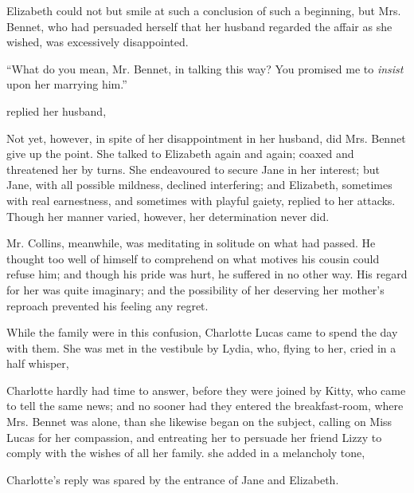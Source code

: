 Elizabeth could not but smile at such a conclusion of such a beginning, but Mrs. Bennet, who had persuaded herself that her husband regarded the affair as she wished, was excessively disappointed.

“What do you mean, Mr. Bennet, in talking this way? You promised me to {\em insist} upon her marrying him.”

 replied her husband, 

Not yet, however, in spite of her disappointment in her husband, did Mrs. Bennet give up the point. She talked to Elizabeth again and again; coaxed and threatened her by turns. She endeavoured to secure Jane in her interest; but Jane, with all possible mildness, declined interfering; and Elizabeth, sometimes with real earnestness, and sometimes with playful gaiety, replied to her attacks. Though her manner varied, however, her determination never did.

Mr. Collins, meanwhile, was meditating in solitude on what had passed. He thought too well of himself to comprehend on what motives his cousin could refuse him; and though his pride was hurt, he suffered in no other way. His regard for her was quite imaginary; and the possibility of her deserving her mother's reproach prevented his feeling any regret.

While the family were in this confusion, Charlotte Lucas came to spend the day with them. She was met in the vestibule by Lydia, who, flying to her, cried in a half whisper, 

Charlotte hardly had time to answer, before they were joined by Kitty, who came to tell the same news; and no sooner had they entered the breakfast-room, where Mrs. Bennet was alone, than she likewise began on the subject, calling on Miss Lucas for her compassion, and entreating her to persuade her friend Lizzy to comply with the wishes of all her family.  she added in a melancholy tone, 

Charlotte's reply was spared by the entrance of Jane and Elizabeth.

